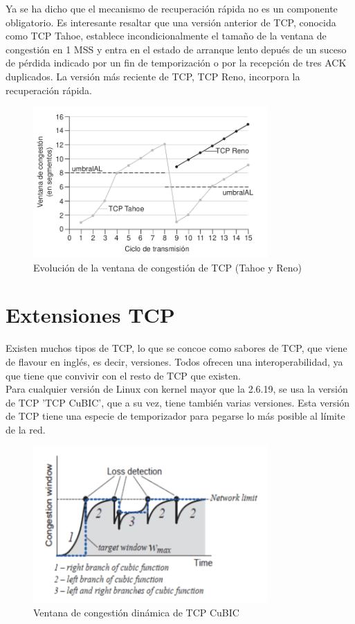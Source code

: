 \documentclass[a4paper,11pt]{article}
\begin{document}
Ya se ha dicho que el mecanismo de recuperación rápida no es un componente obligatorio. Es interesante resaltar que una versión anterior de TCP, conocida como TCP Tahoe, establece incondicionalmente el tamaño de la ventana de congestión en 1 MSS y entra en el estado de arranque lento depués de un suceso de pérdida indicado por un fin de temporización o por la recepción de tres ACK duplicados. La versión más reciente de TCP, TCP Reno, incorpora la recuperación rápida.

\begin{figure}[h]
\centering
\caption{Evolución de la ventana de congestión de TCP (Tahoe y Reno)}
\includegraphics[scale=1,width=0.8\textwidth]{tcp_tahoe_reno.png}
\end{figure}

\section{Extensiones TCP}
Existen muchos tipos de TCP, lo que se concoe como sabores de TCP, que viene de flavour en inglés, es decir, versiones. Todos ofrecen una interoperabilidad, ya que tiene que convivir con el resto de TCP que existen. \\

Para cualquier versión de Linux con kernel mayor que la 2.6.19, se usa la versión de TCP 'TCP CuBIC', que a su vez, tiene también varias versiones. Esta versión de TCP tiene una especie de temporizador para pegarse lo más posible al límite de la red.

\begin{figure}[h]
\centering
\caption{Ventana de congestión dinámica de TCP CuBIC}
\includegraphics[scale=1,width=0.8\textwidth]{ventana_congestion.png}
\end{figure}
\end{document}
